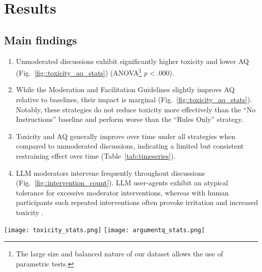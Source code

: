 %

\section{Results}
\label{sec:results}

\subsection{Main findings}

\begin{enumerate}
    \item Unmoderated discussions exhibit significantly higher toxicity and lower \ac{AQ} (Fig.~\ref{fig::toxicity_aq_stats}) (ANOVA\footnote{The large size and balanced nature of our dataset allows the use of parametric tests.} $p<.000$).

    \item  While the Moderation and Facilitation Guidelines slightly improve \ac{AQ} relative to baselines, their impact is marginal (Fig.~\ref{fig::toxicity_aq_stats}). Notably, these strategies do not reduce toxicity more effectively than the “No Instructions” baseline and perform worse than the “Rules Only” strategy.

    \item Toxicity and \ac{AQ} generally improve over time under all strategies when compared to unmoderated discussions, indicating a limited but consistent restraining effect over time (Table~\ref{tab:timeseries}).

    \item \ac{LLM} moderators intervene frequently throughout discussions (Fig.~\ref{fig::intervention_count}). \ac{LLM} user-agents exhibit an atypical tolerance for excessive moderator interventions, whereas with human participants such repeated interventions often provoke irritation and increased toxicity \cite{schaffner_community_guidelines, make_reddit_great, proactive_moderation, cresci_pesonalized_interventions}.
\end{enumerate}


\begin{figure*}[t]
    \texttt{[image: toxicity\_stats.png]} \hfill
    \texttt{[image: argumentq\_stats.png]}
	\centering
	\caption{Mean difference of Toxicity (left) and \ac{AQ} (right) between each moderation strategy. $A[i, j] = 0.3^{***}$ indicates that the strategy $i$ leads to overall worse discussions (more toxicity/worse arguments) compared to $j$ for an average of $0.3$ points with $p<0.001$. Each comparison is accompanied by pairwise student-t tests, in the form of significance asterisks.}
	\label{fig::toxicity_aq_stats}
\end{figure*}

